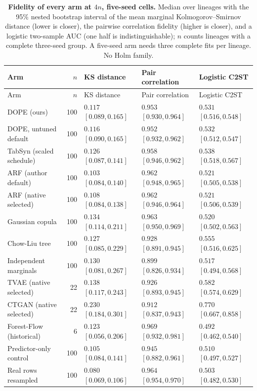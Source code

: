 \begin{longtable}{@{}p{1.6in}rlll@{}}
\caption{\textbf{Fidelity of every arm at $4n$, five-seed cells.} Median over lineages with the 95\% nested bootstrap interval of the mean marginal Kolmogorov--Smirnov distance (lower is closer), the pairwise correlation fidelity (higher is closer), and a logistic two-sample AUC (one half is indistinguishable); $n$ counts lineages with a complete three-seed group. A five-seed arm needs three complete fits per lineage. No Holm family.}\label{tab:v2-fidelity}\\
\toprule
Arm & $n$ & KS distance & Pair correlation & Logistic C2ST \\
\midrule
\endfirsthead
\toprule
Arm & $n$ & KS distance & Pair correlation & Logistic C2ST \\
\midrule
\endhead
DOPE (ours) & 100 & $0.117$ $[0.089, 0.165]$ & $0.953$ $[0.930, 0.964]$ & $0.531$ $[0.516, 0.548]$ \\
DOPE, untuned default & 100 & $0.116$ $[0.090, 0.165]$ & $0.952$ $[0.932, 0.962]$ & $0.532$ $[0.512, 0.547]$ \\
TabSyn (scaled schedule) & 100 & $0.126$ $[0.087, 0.141]$ & $0.958$ $[0.946, 0.962]$ & $0.538$ $[0.518, 0.567]$ \\
ARF (author default) & 100 & $0.103$ $[0.084, 0.140]$ & $0.962$ $[0.948, 0.965]$ & $0.521$ $[0.505, 0.538]$ \\
ARF (native selected) & 100 & $0.108$ $[0.084, 0.138]$ & $0.962$ $[0.946, 0.964]$ & $0.521$ $[0.506, 0.539]$ \\
Gaussian copula & 100 & $0.134$ $[0.114, 0.211]$ & $0.963$ $[0.950, 0.969]$ & $0.520$ $[0.502, 0.563]$ \\
Chow-Liu tree & 100 & $0.127$ $[0.085, 0.229]$ & $0.928$ $[0.891, 0.945]$ & $0.555$ $[0.516, 0.625]$ \\
Independent marginals & 100 & $0.130$ $[0.081, 0.267]$ & $0.899$ $[0.826, 0.934]$ & $0.517$ $[0.494, 0.568]$ \\
TVAE (native selected) & 22 & $0.138$ $[0.117, 0.243]$ & $0.926$ $[0.893, 0.945]$ & $0.582$ $[0.574, 0.629]$ \\
CTGAN (native selected) & 22 & $0.230$ $[0.184, 0.301]$ & $0.912$ $[0.837, 0.943]$ & $0.770$ $[0.667, 0.858]$ \\
Forest-Flow (historical) & 6 & $0.123$ $[0.056, 0.206]$ & $0.969$ $[0.932, 0.981]$ & $0.492$ $[0.462, 0.540]$ \\
Predictor-only control & 100 & $0.105$ $[0.084, 0.141]$ & $0.945$ $[0.882, 0.961]$ & $0.510$ $[0.497, 0.527]$ \\
Real rows resampled & 100 & $0.080$ $[0.069, 0.106]$ & $0.964$ $[0.954, 0.970]$ & $0.503$ $[0.482, 0.530]$ \\
\bottomrule
\end{longtable}
